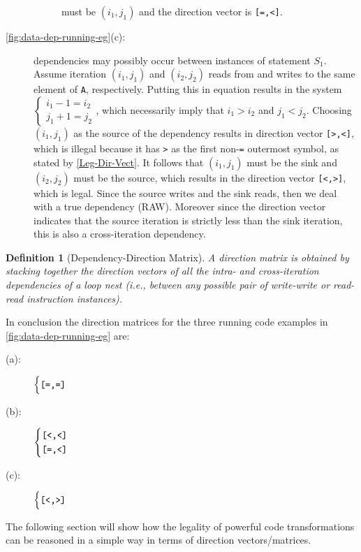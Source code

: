\documentclass[acmsmall,review]{acmart}\settopmatter{printfolios=true,printccs=false,printacmref=false}
\newtheorem{mydef}{Definition}
\begin{document}
\begin{description}
\begin{description}
        must be $(i_1,j_1)$ and the direction vector is {\tt[=,<]}.
    \end{description}
    \item[\cref{fig:data-dep-running-eg}(c):] dependencies
        may possibly occur between instances of statement $S_1$.
        Assume iteration $(i_1,j_1)$ and $(i_2,j_2)$ reads from 
        and writes to the same element of {\tt A}, respectively.
        Putting this in equation results in the system
        $\begin{cases}i_1-1 = i_2\\j_1+1 = j_2\end{cases}$,
        which necessarily imply that $i_1 > i_2$ and
        $j_1 < j_2$. Choosing $(i_1,j_1)$ as the source
        of the dependency results in direction vector
        {\tt[>,<]}, which is illegal because it has
        {\tt >} as the first non-{\tt=} outermost symbol,
        as stated by \cref{Leg-Dir-Vect}. It follows that
        $(i_1,j_1)$ must be the sink and $(i_2,j_2)$
        must be the source, which results in the direction
        vector {\tt[<,>]}, which is legal. Since the source 
        writes and the sink reads, then we deal with a true 
        dependency (RAW). 
        Moreover since the direction vector
        indicates that the source iteration is strictly 
        less than the sink iteration, this is also a
        cross-iteration dependency.
\end{description}

\begin{mydef}[Dependency-Direction Matrix]\label{Dep-Dir-Mat}
A direction matrix is obtained by stacking together the
direction vectors of all the intra- and cross-iteration
dependencies of a loop nest (i.e., between any possible
pair of write-write or read-read instruction instances).
\end{mydef}

In conclusion the direction matrices for the three running
code examples in \cref{fig:data-dep-running-eg} are:
\begin{description}
    \item[(a):] $\begin{cases}\mbox{\tt [=,=]}\end{cases}$
    \item[(b):] $\begin{cases}\mbox{\tt[<,<]}\\\mbox{\tt[=,<]}\end{cases}$
    \item[(c):] $\begin{cases}\mbox{\tt[<,>]}\end{cases}$
\end{description}
The following section will show how the legality of powerful code
transformations can be reasoned in a simple way in terms of 
direction vectors/matrices.
 
\end{document}
